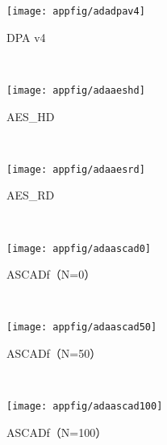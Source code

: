 {	\begin{appfig}[!htb]
		\centering
		\begin{subfigure}[b]{\trif\textwidth}
			\texttt{[image: appfig/adadpav4]}
			\caption{DPA v4}
			\label{fig:adadpav4}
		\end{subfigure}%
		~%
		\begin{subfigure}[b]{\trif\textwidth}
			\texttt{[image: appfig/adaaeshd]}
			\caption{AES\_HD}
			\label{fig:adaaeshd}
		\end{subfigure}
		~%
		\begin{subfigure}[b]{\trif\textwidth}
			\texttt{[image: appfig/adaaesrd]}
			\caption{AES\_RD}
			\label{fig:adaaesrd}
		\end{subfigure}
		\\%
		\begin{subfigure}[b]{\trif\textwidth}
			\texttt{[image: appfig/adaascad0]}
			\caption{ASCADf（N=0）}
			\label{fig:adaascad0}
		\end{subfigure}%
		~%
		\begin{subfigure}[b]{\trif\textwidth}
			\texttt{[image: appfig/adaascad50]}
			\caption{ASCADf（N=50）}
			\label{fig:adaascad50}
		\end{subfigure}
		~%
		\begin{subfigure}[b]{\trif\textwidth}
			\texttt{[image: appfig/adaascad100]}
			\caption{ASCADf（N=100）}
			\label{fig:adaascad100}
		\end{subfigure}
		\\%
		\label{appfig:adadlsca}
	\end{appfig}
	
}

